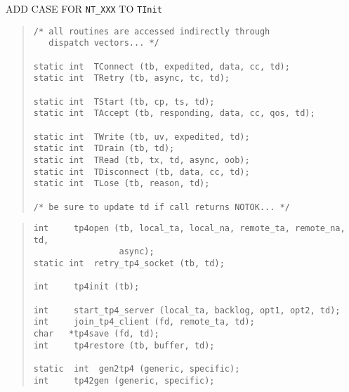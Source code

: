 \begin{bwslide}

\begin{nrtc}
\item	ADD CASE FOR \verb"NT_XXX" TO \verb"TInit"
\end{nrtc}
\end{bwslide}


\begin{bwslide}

\begin{quote}\small\begin{verbatim}
/* all routines are accessed indirectly through 
   dispatch vectors... */

static int  TConnect (tb, expedited, data, cc, td);
static int  TRetry (tb, async, tc, td);

static int  TStart (tb, cp, ts, td);
static int  TAccept (tb, responding, data, cc, qos, td);

static int  TWrite (tb, uv, expedited, td);
static int  TDrain (tb, td);
static int  TRead (tb, tx, td, async, oob);
static int  TDisconnect (tb, data, cc, td);
static int  TLose (tb, reason, td);

/* be sure to update td if call returns NOTOK... */
\end{verbatim}\end{quote}
\end{bwslide}


\begin{bwslide}

\begin{quote}\small\begin{verbatim}
int     tp4open (tb, local_ta, local_na, remote_ta, remote_na, td,
                 async);
static int  retry_tp4_socket (tb, td);

int     tp4init (tb);

int     start_tp4_server (local_ta, backlog, opt1, opt2, td);
int     join_tp4_client (fd, remote_ta, td);
char   *tp4save (fd, td);
int     tp4restore (tb, buffer, td);

static  int  gen2tp4 (generic, specific);
int     tp42gen (generic, specific);
\end{verbatim}\end{quote}
\end{bwslide}


